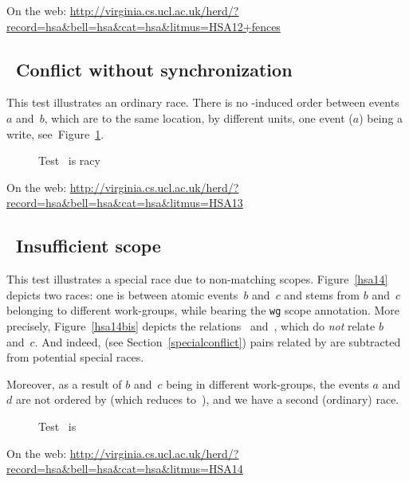 \documentclass[a4paper]{article}
\begin{document}
On the web:
\url{http://virginia.cs.ucl.ac.uk/herd/?record=hsa&bell=hsa&cat=hsa&litmus=HSA12+fences}

\pagebreak

\subsection{~Conflict without synchronization}

This test illustrates an ordinary race.
There is no \hhb-induced order between events $a$ and~$b$, which
are to the same location, by different units, one event ($a$) being a write,
see~Figure~\ref{hsa13}.
\begin{figure}[htp]
\begin{center}\moveback{}
\end{center}
\caption{\label{hsa13} Test~ is racy \color{blue}{(Racy)}}
\end{figure}

On the web:
\url{http://virginia.cs.ucl.ac.uk/herd/?record=hsa&bell=hsa&cat=hsa&litmus=HSA13}

\pagebreak

\subsection{~Insufficient scope}

This test illustrates a special race due to non-matching scopes.
Figure~\ref{hsa14} depicts two races: one is between atomic events~$b$ and~$c$
and stems from $b$ and~$c$ belonging to different work-groups, while bearing
the \texttt{wg} scope annotation.  More precisely, Figure~\ref{hsa14bis}
depicts the relations~ and~, which do \emph{not} relate
$b$ and~$c$.  And indeed, (see Section~\ref{specialconflict}) pairs related by
 are subtracted from potential special races.

Moreover, as a result of $b$ and~$c$ being in different work-groups,
the events $a$ and~$d$ are not ordered by \hhb (which reduces to~\po),
and we have a second (ordinary) race.
\begin{figure}[htp]
\begin{center}

\end{center}
\caption{Test~ is \color{blue}{racy}}
\end{figure}

On the web:
\url{http://virginia.cs.ucl.ac.uk/herd/?record=hsa&bell=hsa&cat=hsa&litmus=HSA14}

%

 
\end{document}
